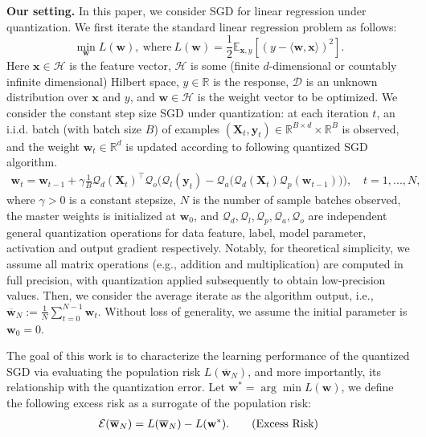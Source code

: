 \documentclass[11pt, letterpaper]{article}
\begin{document}
\textbf{Our setting.} In this paper, we consider SGD for linear regression under quantization. We first iterate the standard linear regression problem as follows:
\begin{equation*}
    \min_{\mathbf{w}}L(\mathbf{w}),\ \text{where} \ L(\mathbf{w})=\frac{1}{2}\mathbb{E}_{\mathbf{x},y}\left[\left(y-\langle \mathbf{w},\mathbf{x} \rangle \right)^2\right].
\end{equation*}
Here $\mathbf{x}\in \mathcal{H}$ is the feature vector, $\mathcal{H}$ is some (finite $d$-dimensional or countably infinite dimensional) Hilbert space, $y\in \mathbb{R}$ is the response, $\mathcal{D}$ is an unknown distribution over $\mathbf{x}$ and $y$, and $\mathbf{w}\in \mathcal{H}$ is the weight vector to be optimized. We consider the constant step size SGD under quantization: at each iteration $t$, an i.i.d. batch (with batch size $B$) of examples $(\mathbf{X}_t, \mathbf{y}_t)\in \mathbb{R}^{B\times d} \times \mathbb{R}^{B}$ is observed, and the weight $\mathbf{w}_t \in \mathbb{R}^d$ is updated according to following quantized SGD algorithm.
\begin{align}\label{eq:SGD_quantized}
    \mathbf{w}_t=\mathbf{w}_{t-1}+\gamma \frac{1}{B} \mathcal{Q}_d(\mathbf{X}_t)^\top \mathcal{Q}_o\Big(\mathcal{Q}_l(\mathbf{y}_t)-\mathcal{Q}_a\big(\mathcal{Q}_d(\mathbf{X}_t)\mathcal{Q}_p(\mathbf{w}_{t-1})\big)\Big), \quad t=1,...,N, \tag{quantized SGD}
\end{align}
where $\gamma>0$ is a constant stepsize, $N$ is the number of sample batches observed, the master weights is initialized at $\mathbf{w}_0$, and $\mathcal{Q}_d, \mathcal{Q}_l, \mathcal{Q}_p, \mathcal{Q}_a, \mathcal{Q}_o$ are independent general quantization operations for data feature, label, model parameter, activation and output gradient respectively. Notably, for theoretical simplicity, we assume all matrix operations (e.g., addition and multiplication) are computed in full precision, with quantization applied subsequently to obtain low-precision values. Then, we consider the average iterate as the algorithm output, i.e., $\overline{\mathbf{w}}_N:=\frac{1}{N}\sum_{t=0}^{N-1}\mathbf{w}_t$. Without loss of generality, we assume the initial parameter is $\mathbf{w}_0=0$.

The goal of this work is to characterize the learning performance of the quantized SGD via evaluating the population risk $L(\overline{\mathbf{w}}_N)$, and more importantly, its relationship with the quantization error. Let $\mathbf w^*=\arg\min L(\mathbf w)$, we define the following excess risk as a surrogate of the population risk:
\begin{align}\label{eq:excess_risk}
\mathcal{E}(\overline{\mathbf{w}}_N) = L(\overline{\mathbf{w}}_N) - L(\mathbf w^*).\tag{\text{Excess Risk}}
\end{align}
\end{document}
